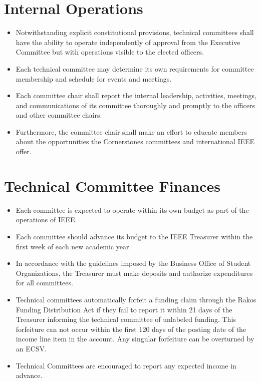 \documentclass[12pt]{constitution}
\begin{document}
\section{Internal Operations}
\label{sec:tech_operate}
\begin{itemize}
    \item Notwithstanding explicit constitutional provisions, technical committees shall have the ability to operate independently of approval from the Executive Committee but with operations visible to the elected officers.
    \item Each technical committee may determine its own requirements for committee membership and schedule for events and meetings.
    \item Each committee chair shall report the internal leadership, activities, meetings, and communications of its committee thoroughly and promptly to the officers and other committee chairs.
    \item Furthermore, the committee chair shall make an effort to educate members about the opportunities the Cornerstones committees and international IEEE offer.
\end{itemize}

\section{Technical Committee Finances}
\label{sec:tech_budget}
\begin{itemize}
    \item Each committee is expected to operate within its own budget as part of the operations of IEEE.
    \item Each committee should advance its budget to the IEEE Treasurer within the first week of each new academic year.
    \item In accordance with the guidelines imposed by the Business Office of Student Organizations, the Treasurer must make deposits and authorize expenditures for all committees.
    \item Technical committees automatically forfeit a funding claim through the Rakos Funding Distribution Act if they fail to report it within 21 days of the Treasurer informing the technical committee of unlabeled funding. This forfeiture can not occur within the first 120 days of the posting date of the income line item in the account. Any singular forfeiture can be overturned by an ECSV.
    \item Technical Committees are encouraged to report any expected income in advance.
\end{itemize}
\end{document}
